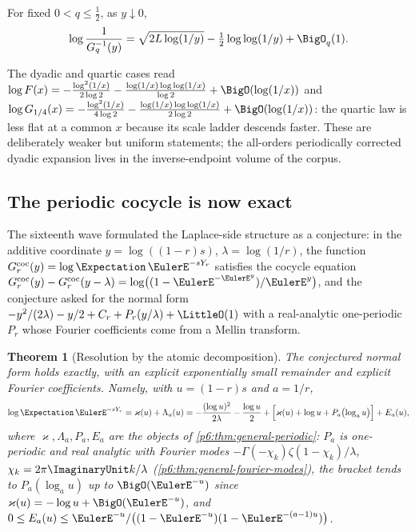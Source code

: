 \documentclass[11pt,oneside]{article}
\numberwithin{equation}{section}
\newtheorem{theorem}{Theorem}[section]
\theoremstyle{definition}
\theoremstyle{remark}
\begin{document}
\begin{corollary}
\label{p7:cor:inverse-asymptotic}
For fixed $0<q\le\tfrac12$, as $y\downarrow0$,
\begin{equation}\label{p7:eq:inverse-asymptotic}
 \log\frac1{G_q^{-1}(y)}
 =\sqrt{2L\log(1/y)}-\tfrac12\log\log(1/y)+\BigO_q(1).
\end{equation}
\end{corollary}

The dyadic and quartic cases read
$\log F(x)=-\tfrac{\log^2(1/x)}{2\log2}-\tfrac{\log(1/x)\log\log(1/x)}{\log2}
+\BigO(\log(1/x))$ and
$\log G_{1/4}(x)=-\tfrac{\log^2(1/x)}{4\log2}
-\tfrac{\log(1/x)\log\log(1/x)}{2\log2}+\BigO(\log(1/x))$: the quartic law is
less flat at a common $x$ because its scale ladder descends faster.  These
are deliberately weaker but uniform statements; the all-orders periodically
corrected dyadic expansion lives in the inverse-endpoint volume of the
corpus.

\subsection{The periodic cocycle is now exact}

The sixteenth wave formulated the Laplace-side structure as a conjecture: in
the additive coordinate $y=\log((1-r)s)$, $\lambda=\log(1/r)$, the function
$G_r^{\mathrm{coc}}(y)=\log\Expectation\,\EulerE^{-sY_r}$ satisfies the cocycle equation
$G^{\mathrm{coc}}_r(y)-G^{\mathrm{coc}}_r(y-\lambda)
=\log\bigl((1-\EulerE^{-\EulerE^y})/\EulerE^y\bigr)$, and the conjecture asked for the
normal form
$-y^2/(2\lambda)-y/2+C_r+P_r(y/\lambda)+\LittleO(1)$ with a real-analytic
one-periodic $P_r$ whose Fourier coefficients come from a Mellin transform.

\begin{theorem}[Resolution by the atomic decomposition]
\label{p7:thm:cocycle-resolved}
The conjectured normal form holds exactly, with an explicit exponentially
small remainder and explicit Fourier coefficients.  Namely, with
$u=(1-r)s$ and $a=1/r$,
\begin{equation}\label{p7:eq:cocycle-exact}
 \log\Expectation\,\EulerE^{-sY_r}
 =\varkappa(u)+\Lambda_{a}(u)
 =-\frac{(\log u)^2}{2\lambda}-\frac{\log u}{2}
 +\Bigl[\varkappa(u)+\log u+P_{a}\bigl(\log_{a}u\bigr)\Bigr]
 +E_{a}(u),
\end{equation}
where $\varkappa,\Lambda_a,P_a,E_a$ are the objects of
\cref{p6:thm:general-periodic}: $P_{a}$ is one-periodic and real analytic
with Fourier modes $-\Gamma(-\chi_k)\zeta(1-\chi_k)/\lambda$,
$\chi_k=2\pi\ImaginaryUnit k/\lambda$ (\cref{p6:thm:general-fourier-modes}), the bracket
tends to $P_a(\log_au)$ up to $\BigO(\EulerE^{-u})$ since
$\varkappa(u)=-\log u+\BigO(\EulerE^{-u})$, and
$0\le E_{a}(u)\le\EulerE^{-u}/\bigl((1-\EulerE^{-u})(1-\EulerE^{-(a-1)u})\bigr)$.
\end{theorem}
\end{document}
